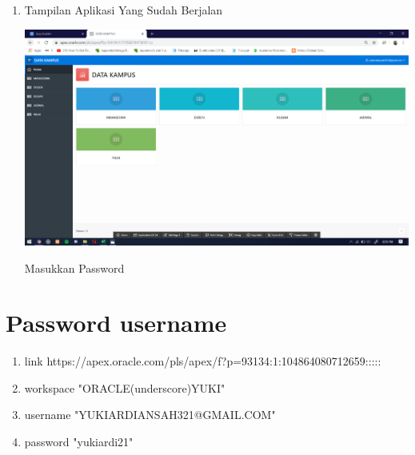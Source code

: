 \documentclass{article}
\begin{document}
\begin{enumerate}
    \item Tampilan Aplikasi Yang Sudah Berjalan
    \begin{center}
         \centering
            \includegraphics[scale=0.27]{figures/DB15.png}
        \caption{Masukkan Password}
        \label{excel}
    \end{center}
\end{enumerate}

\section{Password username}
      
      \begin{enumerate}
      
          \item link https://apex.oracle.com/pls/apex/f?p=93134:1:104864080712659:::::
          \item workspace "ORACLE(underscore)YUKI"
          
          \item username "YUKIARDIANSAH321@GMAIL.COM"
          
          \item password "yukiardi21"
      \end{enumerate}
      
       
\end{document}
